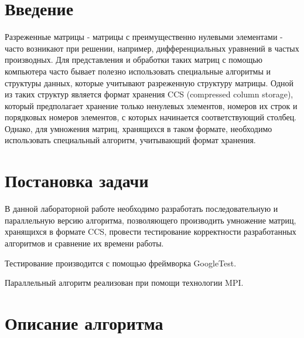 \documentclass{report}
\begin{document}
\setcounter{page}{2}

\tableofcontents
\clearpage

\section*{Введение}

\par Разреженные матрицы - матрицы с преимущественно нулевыми элементами - часто возникают при решении, например, дифференциальных уравнений в частых производных. Для представления и обработки таких матриц с помощью компьютера часто бывает полезно использовать специальные алгоритмы и структуры данных, которые учитывают разреженную структуру матрицы. Одной из таких структур является формат хранения CCS (compressed column storage), который предполагает хранение только ненулевых элементов, номеров их строк и порядковых номеров элементов, с которых начинается соответствующий столбец. Однако, для умножения матриц, хранящихся в таком формате, необходимо использовать специальный алгоритм, учитывающий формат хранения.

\clearpage

\section*{Постановка задачи}

\par В данной лабораторной работе необходимо разработать последовательную и параллельную версию алгоритма, позволяющего производить умножение матриц, хранящихся в формате CCS, провести тестирование корректности разработанных алгоритмов и сравнение их времени работы.
\par Тестирование производится с помощью фреймворка GoogleTest.
\par Параллельный алгоритм реализован при помощи технологии MPI.

\clearpage

\section*{Описание алгоритма}
\end{document}
